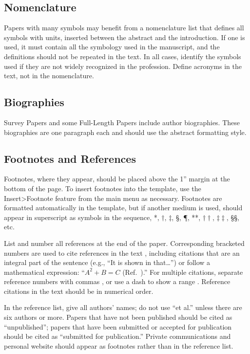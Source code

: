 \documentclass[journal]{new-aiaa}
\begin{document}
\subsection{Nomenclature}
Papers with many symbols may benefit from a nomenclature list that defines all symbols with units, inserted between the abstract and the introduction. If one is used, it must contain all the symbology used in the manuscript, and the definitions should not be repeated in the text. In all cases, identify the symbols used if they are not widely recognized in the profession. Define acronyms in the text, not in the nomenclature. 

\subsection{Biographies}
Survey Papers and some Full-Length Papers include author biographies. These biographies are one paragraph each and should use the abstract formatting style.

\subsection{Footnotes and References}
Footnotes, where they appear, should be placed above the 1'' margin at the bottom of the page. To insert footnotes into the template, use the Insert>Footnote feature from the main menu as necessary. Footnotes are formatted automatically in the template, but if another medium is used, should appear in superscript as symbols in the sequence, *, $\dag$, $\ddag$, \S, \P, **, $\dag\dag$, $\ddag\ddag$, \S\S, etc.

List and number all references at the end of the paper. Corresponding bracketed numbers are used to cite references in the text \cite{vatistas1986reverse}, including citations that are an integral part of the sentence (e.g., ``It is shown in \cite{dornheim1996planetary} that\ldots '') or follow a mathematical expression: ``$A^{2} + B = C$ (Ref.~\cite{terster1997nasa}).'' For multiple citations, separate reference numbers with commas \cite{peyret2012computational,oates1997aerothermodynamics}, or use a dash to show a range \cite{volpe1994techniques,thompsonspacecraft,chi1993fluid}. Reference citations in the text should be in numerical order.

In the reference list, give all authors' names; do not use ``et al.'' unless there are six authors or more. Papers that have not been published should be cited as ``unpublished''; papers that have been submitted or accepted for publication should be cited as ``submitted for publication.'' Private communications and personal website should appear as footnotes rather than in the reference list.
\end{document}
